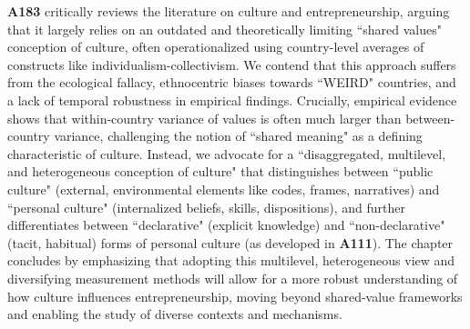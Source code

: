 \documentclass[a4paper,11pt]{extarticle}
\begin{document}
\textbf{A183} critically reviews the literature on culture and entrepreneurship, arguing that it largely relies on an outdated and theoretically limiting ``shared values" conception of culture, often operationalized using country-level averages of constructs like individualism-collectivism. We contend that this approach suffers from the ecological fallacy, ethnocentric biases towards ``WEIRD" countries, and a lack of temporal robustness in empirical findings. Crucially, empirical evidence shows that within-country variance of values is often much larger than between-country variance, challenging the notion of ``shared meaning" as a defining characteristic of culture. Instead, we advocate for a ``disaggregated, multilevel, and heterogeneous conception of culture" that distinguishes between ``public culture" (external, environmental elements like codes, frames, narratives) and ``personal culture" (internalized beliefs, skills, dispositions), and further differentiates between ``declarative" (explicit knowledge) and ``non-declarative" (tacit, habitual) forms of personal culture (as developed in \textbf{A111}). The chapter concludes by emphasizing that adopting this multilevel, heterogeneous view and diversifying measurement methods will allow for a more robust understanding of how culture influences entrepreneurship, moving beyond shared-value frameworks and enabling the study of diverse contexts and mechanisms.
\end{document}
